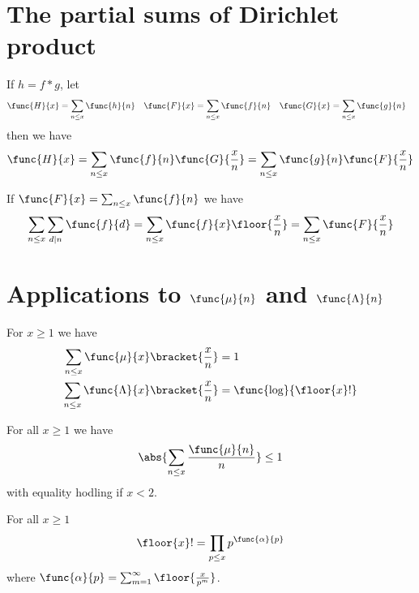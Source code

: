 \section{The partial sums of Dirichlet product}
\begin{theorem}
    If \(h = f \ast g\), let 
    \begin{align*}
        \func{H}{x} &= \sum_{n \leq x} \func{h}{n} & \func{F}{x} &= \sum_{n \leq x} \func{f}{n} & \func{G}{x} &= \sum_{n \leq x} \func{g}{n}
    \end{align*}
    then we have 
    \begin{equation*}
        \func{H}{x} = \sum_{n \leq x} \func{f}{n} \func{G}{\frac{x}{n}} =  \sum_{n \leq x} \func{g}{n} \func{F}{\frac{x}{n}}
    \end{equation*}
\end{theorem}

\begin{theorem}
    If \( \func{F}{x} = \sum_{n \leq x} \func{f}{n}\) we have 
    \begin{equation*}
        \sum_{n \leq x} \sum_{d \mid n} \func{f}{d} = \sum_{n \leq x} \func{f}{x} \floor{\dfrac{x}{n}} = \sum_{n \leq x} \func{F}{\frac{x}{n}}
    \end{equation*}
\end{theorem}
\section{Applications to \(\func{\mu}{n}\) and \(\func{\Lambda}{n}\)}
\begin{theorem}
    For \(x \geq 1\) we have 
    \begin{align*}
        \sum_{n \leq x} \func{\mu}{x} \bracket{\dfrac{x}{n}} &= 1\\
        \sum_{n \leq x} \func{\Lambda}{x} \bracket{\dfrac{x}{n}} &= \func{\log}{\floor{x}!}\\
    \end{align*}
\end{theorem}

\begin{theorem}
    For all \(x \geq 1\) we have 
    \begin{equation*}
        \abs{\sum_{n \leq x} \dfrac{\func{\mu}{n}}{n}} \leq 1
    \end{equation*}
    with equality hodling if \(x < 2\).
\end{theorem}

\begin{theorem}
    For all \(x \geq 1\)
    \begin{equation*}
        \floor{x}! = \prod_{p \leq x} p^{\func{\alpha}{p}}
    \end{equation*}
    where \(\func{\alpha}{p} = \sum_{m = 1}^{\infty} \floor{\frac{x}{p^m}}\).
\end{theorem}

